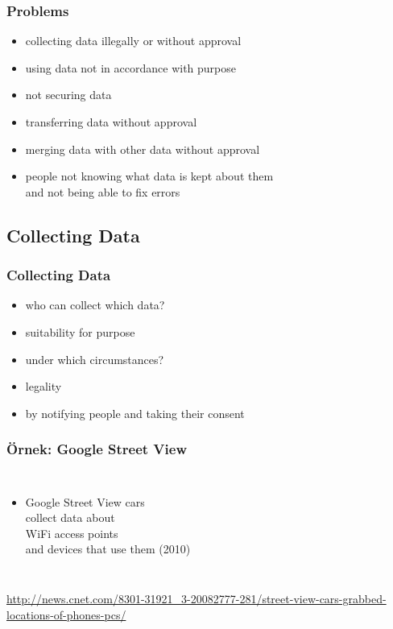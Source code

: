 \documentclass[dvipsnames]{beamer}
\theoremstyle{definition}
\theoremstyle{example}
\theoremstyle{plain}
\begin{document}
\begin{frame}
  \frametitle{Problems}

  \begin{itemize}
    \item collecting data illegally or without approval
    \item using data not in accordance with purpose
    \item not securing data
    \item transferring data without approval
    \item merging data with other data without approval
    \item people not knowing what data is kept about them\\
      and not being able to fix errors
  \end{itemize}
\end{frame}

\subsection{Collecting Data}

\begin{frame}
  \frametitle{Collecting Data}

  \begin{itemize}
    \item who can collect which data?
    \item suitability for purpose

    \pause
    \bigskip
    \item under which circumstances?
    \item legality
    \item by notifying people and taking their consent
  \end{itemize}
\end{frame}

\begin{frame}
  \frametitle{Örnek: Google Street View}

  \begin{columns}

    \begin{itemize}
      \item Google Street View cars\\
        collect data about\\
        WiFi access points\\
        and devices that use them (2010)
    \end{itemize}
  \end{columns}

  \medskip
  \tiny{\url{http://news.cnet.com/8301-31921_3-20082777-281/street-view-cars-grabbed-locations-of-phones-pcs/}}\\
\end{frame}
\end{document}
